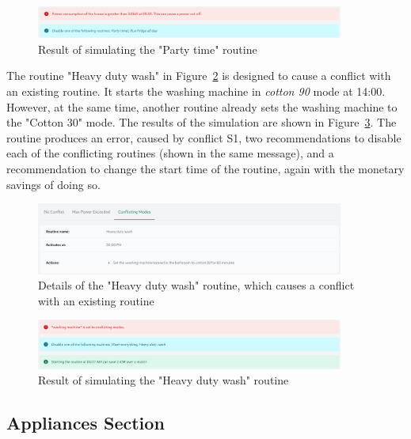 \begin{figure}
    \centering
    \includegraphics[width=0.9\textwidth]{images/frontend/max_power_exceeded_result.png}
    \caption{Result of simulating the "Party time" routine}
    \label{fig:frontend_max_power_exceeded_result}
\end{figure}

The routine "Heavy duty wash" in Figure~\ref{fig:frontend_conflicting_modes} is designed to cause a conflict with an existing routine. It starts the washing machine in \textit{cotton 90} mode at 14:00. However, at the same time, another routine already sets the washing machine to the "Cotton 30" mode. The results of the simulation are shown in Figure~\ref{fig:frontend_conflicting_modes_result}. The routine produces an error, caused by conflict S1, two recommendations to disable each of the conflicting routines (shown in the same message), and a recommendation to change the start time of the routine, again with the monetary savings of doing so.

\begin{figure}
    \centering
    \includegraphics[width=0.9\textwidth]{images/frontend/conflicting_modes.png}
    \caption{Details of the "Heavy duty wash" routine, which causes a conflict with an existing routine}
    \label{fig:frontend_conflicting_modes}
\end{figure}

\begin{figure}
    \centering
    \includegraphics[width=0.9\textwidth]{images/frontend/conflicting_modes_result.png}
    \caption{Result of simulating the "Heavy duty wash" routine}
    \label{fig:frontend_conflicting_modes_result}
\end{figure}

\subsection{Appliances Section}

